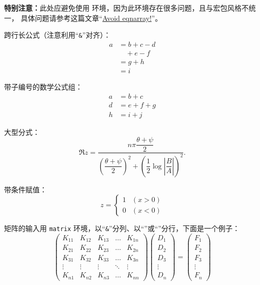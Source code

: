 \textbf{特别注意：}此处应避免使用  环境，因为此环境存在很多问题，且与宏包风格不统一，
具体问题请参考这篇文章“\href{https://tug.org/pracjourn/2006-4/madsen/madsen.pdf}{Avoid eqnarray!}”。

跨行长公式（注意利用“\texttt{\&}”对齐）：
\begin{equation}
\begin{split}
a& =b+c-d\\
 & \quad +e-f\\
 & =g+h\\
 & =i
\end{split}
\end{equation}

带子编号的数学公式组：
\begin{subequations}\label{eq:samples:grp}
\begin{align}
a&=b+c\label{eq:samples:grp:a}\\
d&=e+f+g\label{eq:samples:grp:b}\\
h&=i+j\label{eq:samples:grp:c}
\end{align}
\end{subequations}

大型分式：
\begin{equation}
\Re{z} =\frac{n\pi \dfrac{\theta +\psi}{2}}{
        \left(\dfrac{\theta +\psi}{2}\right)^2 + \left( \dfrac{1}{2}
        \log \left\lvert\dfrac{B}{A}\right\rvert\right)^2}.
\end{equation}

带条件赋值：
\begin{equation}
z = \left\{
\begin{array}{ll}
1 & (x>0)\\
0 & (x<0)
\end{array}
\right.
\end{equation}

矩阵的输入用 \texttt{matrix} 环境，以“\texttt{\&}”分列、以“\ltxcmdname{\textbackslash}”或“”分行，下面是一个例子：
\begin{equation}
\left(
  \begin{matrix}
    K_{11} &K_{12} &K_{13} &\ldots &K_{1n}\\
    K_{21} &K_{22} &K_{23} &\ldots &K_{2n}\\
    K_{31} &K_{32} &K_{33} &\ldots &K_{3n}\\
    \vdots &\vdots &\vdots &\ddots &\vdots\\
    K_{n1} &K_{n2} &K_{n3} &\ldots &K_{nn}
  \end{matrix}
\right) \left(
  \begin{matrix}
     D_{1}\\ D_{2}\\ D_{3}\\ \vdots\\ D_{n}
  \end{matrix}
\right) = \left(
  \begin{matrix}
    F_{1}\\ F_{2}\\ F_{3}\\ \vdots\\ F_{n}
  \end{matrix}
\right)
\end{equation}

